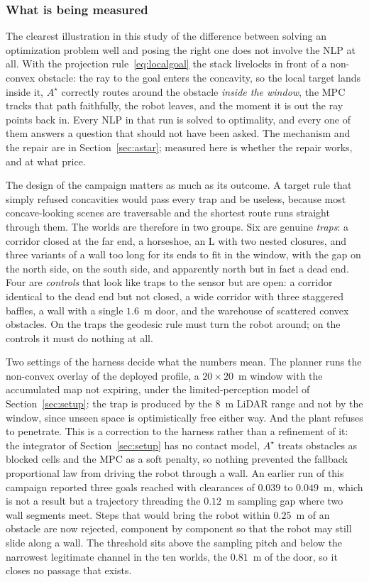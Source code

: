 \documentclass[11pt,a4paper]{article}
\newcommand{\astar}{$A^\star$}
\begin{document}
\subsubsection{What is being measured}
\label{sec:localmin}

The clearest illustration in this study of the difference between solving an optimization problem well and
posing the right one does not involve the NLP at all. With the projection rule~\eqref{eq:localgoal} the
stack livelocks in front of a non-convex obstacle: the ray to the goal enters the concavity, so the local
target lands inside it, \astar{} correctly routes around the obstacle \emph{inside the window}, the MPC
tracks that path faithfully, the robot leaves, and the moment it is out the ray points back in. Every NLP in
that run is solved to optimality, and every one of them answers a question that should not have been asked.
The mechanism and the repair are in Section~\ref{sec:astar}; measured here is whether the repair works, and
at what price.

The design of the campaign matters as much as its outcome. A target rule that simply refused concavities
would pass every trap and be useless, because most concave-looking scenes are traversable and the shortest
route runs straight through them. The worlds are therefore in two groups. Six are genuine \emph{traps}: a
corridor closed at the far end, a horseshoe, an L with two nested closures, and three variants of a wall too
long for its ends to fit in the window, with the gap on the north side, on the south side, and apparently
north but in fact a dead end. Four are \emph{controls} that look like traps to the sensor but are open: a
corridor identical to the dead end but not closed, a wide corridor with three staggered baffles, a wall with
a single $1.6$~m door, and the warehouse of scattered convex obstacles. On the traps the geodesic rule must
turn the robot around; on the controls it must do nothing at all.

Two settings of the harness decide what the numbers mean. The planner runs the non-convex overlay of the
deployed profile, a $20\times20$~m window with the accumulated map not expiring, under the limited-perception
model of Section~\ref{sec:setup}: the trap is produced by the $8$~m LiDAR range and not by the window, since
unseen space is optimistically free either way. And the plant refuses to penetrate. This is a correction to
the harness rather than a refinement of it: the integrator of Section~\ref{sec:setup} has no contact model,
\astar{} treats obstacles as blocked cells and the MPC as a soft penalty, so nothing prevented the fallback
proportional law from driving the robot through a wall. An earlier run of this campaign reported three goals
reached with clearances of $0.039$ to $0.049$~m, which is not a result but a trajectory threading the
$0.12$~m sampling gap where two wall segments meet. Steps that would bring the robot within $0.25$~m of an
obstacle are now rejected, component by component so that the robot may still slide along a wall. The
threshold sits above the sampling pitch and below the narrowest legitimate channel in the ten worlds, the
$0.81$~m of the door, so it closes no passage that exists.
\end{document}
